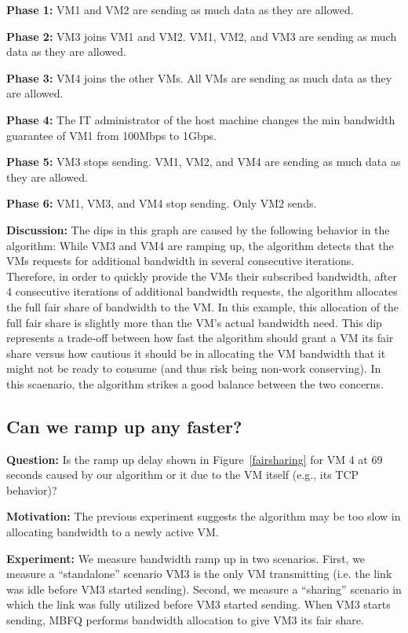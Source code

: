 {\bf Phase 1:}  VM1 and VM2 are sending as much data as they are allowed.

{\bf Phase 2:} VM3 joins VM1 and VM2.  VM1, VM2, and VM3 are sending as much data as they are allowed.

{\bf  Phase 3:} VM4 joins the other VMs. All VMs are sending as much data as they are allowed.

{\bf  Phase 4:} The IT administrator of the host machine changes the min bandwidth guarantee of VM1 from 100Mbps to 1Gbps.

{\bf Phase 5:} VM3 stops sending. VM1, VM2, and VM4 are sending as much data as they are allowed.

{\bf Phase 6:} VM1, VM3, and VM4 stop sending.  Only VM2 sends.

{\bf Discussion:} The dips in this graph are caused by the following behavior in
the algorithm: While VM3 and VM4 are ramping up, the algorithm detects that the
VMs requests for additional bandwidth in several consecutive iterations.
Therefore, in order to quickly provide the VMs their subscribed bandwidth, after
4 consecutive iterations of additional bandwidth requests, the algorithm
allocates the full fair share of bandwidth to the VM.  In this example, this
allocation of the full fair share is slightly more than the VM's actual
bandwidth need.  This dip represents a trade-off between how fast the algorithm
should grant a VM its fair share versus how cautious it should be in allocating
the VM bandwidth that it might not be ready to consume (and thus risk being
non-work conserving). In this scaenario, the algorithm strikes a good balance
between the two concerns. 

\subsection{Can we ramp up any faster?}

{\bf Question:}  Is the ramp up delay shown in Figure~\ref{fairsharing} for VM 4
at 69 seconds caused by our algorithm or it due to the VM itself (e.g., its TCP
behavior)?

{\bf Motivation:} The previous experiment suggests the algorithm may be too slow
in allocating bandwidth to a newly active VM.  

{\bf Experiment:} We measure bandwidth ramp up in two scenarios.  First, we
measure a  ``standalone'' scenario VM3 is the only VM transmitting (i.e. the link
was idle before VM3 started sending).  Second, we measure a  ``sharing'' scenario
in which the link was fully utilized before VM3 started sending. When VM3 starts
sending, MBFQ performs bandwidth allocation to give VM3 its fair share.


